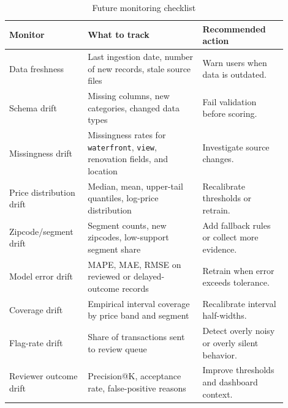 \documentclass[12pt,a4paper]{article}
\begin{document}
\begin{table}[H]
\centering
\caption{Future monitoring checklist}
\label{tab:monitoring_plan}
\begin{tabular}{p{0.24\linewidth}p{0.38\linewidth}p{0.28\linewidth}}
\toprule
\textbf{Monitor} & \textbf{What to track} & \textbf{Recommended action}\\
\midrule
Data freshness & Last ingestion date, number of new records, stale source files & Warn users when data is outdated.\\
Schema drift & Missing columns, new categories, changed data types & Fail validation before scoring.\\
Missingness drift & Missingness rates for \texttt{waterfront}, \texttt{view}, renovation fields, and location & Investigate source changes.\\
Price distribution drift & Median, mean, upper-tail quantiles, log-price distribution & Recalibrate thresholds or retrain.\\
Zipcode/segment drift & Segment counts, new zipcodes, low-support segment share & Add fallback rules or collect more evidence.\\
Model error drift & MAPE, MAE, RMSE on reviewed or delayed-outcome records & Retrain when error exceeds tolerance.\\
Coverage drift & Empirical interval coverage by price band and segment & Recalibrate interval half-widths.\\
Flag-rate drift & Share of transactions sent to review queue & Detect overly noisy or overly silent behavior.\\
Reviewer outcome drift & Precision@K, acceptance rate, false-positive reasons & Improve thresholds and dashboard context.\\
\bottomrule
\end{tabular}
\end{table}
\end{document}
